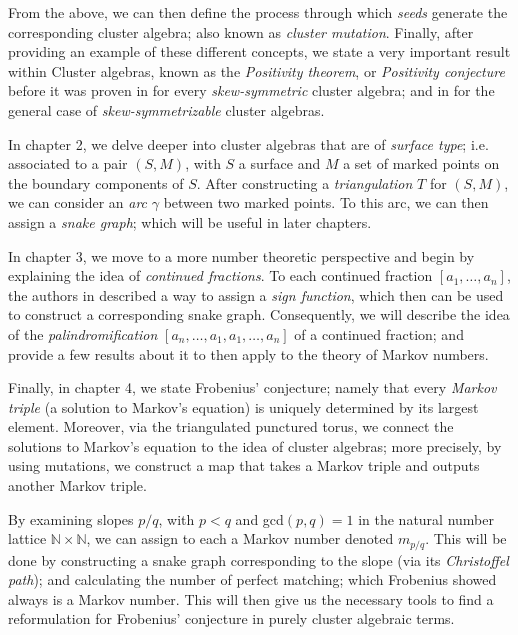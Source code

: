 \documentclass[12pt,vu]{adammath}
\theoremstyle{theorem}
\theoremstyle{corollary}
\theoremstyle{conjecture}
\theoremstyle{proposition}
\theoremstyle{definition}
\theoremstyle{remark}
\begin{document}
From the above, we can then define the process through which \emph{seeds} generate the corresponding cluster algebra; also known as \emph{cluster mutation}. Finally, after providing an example of these different concepts, we state a very important result within Cluster algebras, known as the \emph{Positivity theorem}, or \emph{Positivity conjecture} before it was proven in \cite{LS} for every \emph{skew-symmetric} cluster algebra; and in \cite{GHKK} for the general case of \emph{skew-symmetrizable} cluster algebras.

In chapter 2, we delve deeper into cluster algebras that are of \emph{surface type}; i.e. associated to a pair $(S,M)$, with $S$ a surface and $M$ a set of marked points on the boundary components of $S$. After constructing a \emph{triangulation} $T$ for $(S,M)$, we can consider an \emph{arc} $\gamma$ between two marked points. To this arc, we can then assign a \emph{snake graph}; which will be useful in later chapters.

In chapter 3, we move to a more number theoretic perspective and begin by explaining the idea of \emph{continued fractions}. To each continued fraction $[a_1,\dots,a_n]$, the authors in \cite{CS1} described a way to assign a \emph{sign function}, which then can be used to construct a corresponding snake graph. Consequently, we will describe the idea of the \emph{palindromification} $[a_n,\dots,a_1,a_1,\dots,a_n]$ of a continued fraction; and provide a few results about it to then apply to the theory of Markov numbers. 

Finally, in chapter 4, we state Frobenius' conjecture; namely that every \emph{Markov triple} (a solution to Markov's equation) is uniquely determined by its largest element. Moreover, via the triangulated punctured torus, we connect the solutions to Markov's equation to the idea of cluster algebras; more precisely, by using mutations, we construct a map that takes a Markov triple and outputs another Markov triple. 

By examining slopes $p/q$, with $p<q$ and gcd$(p,q) = 1$ in the natural number lattice $\mathbb{N}\times \mathbb{N}$, we can assign to each a Markov number denoted $m_{p/q}$. This will be done by constructing a snake graph corresponding to the slope (via its \emph{Christoffel path}); and calculating the number of perfect matching; which Frobenius showed always is a Markov number. This will then give us the necessary tools to find a reformulation for Frobenius' conjecture in purely cluster algebraic terms.
\end{document}
